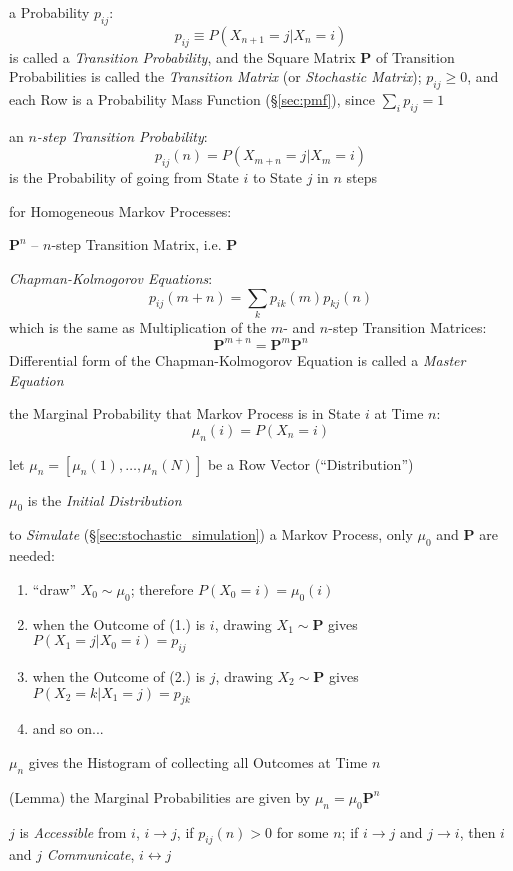 a Probability $p_{ij}$:
\[
  p_{ij} \equiv P(X_{n+1} = j | X_n = i)
\]
is called a \emph{Transition Probability}, and the Square Matrix $\mathbf{P}$ of
Transition Probabilities is called the \emph{Transition Matrix} (or
\emph{Stochastic Matrix});
$p_{ij} \geq 0$, and each Row is a Probability Mass Function (\S\ref{sec:pmf}),
since $\sum_i p_{ij} = 1$

an \emph{$n$-step Transition Probability}:
\[
  p_{ij}(n) = P(X_{m+n} = j | X_m = i)
\]
is the Probability of going from State $i$ to State $j$ in $n$ steps

for Homogeneous Markov Processes:

$\mathbf{P}^n$ -- $n$-step Transition Matrix, i.e. $\mathbf{P}$

\emph{Chapman-Kolmogorov Equations}:
\[
  p_{ij}(m + n) = \sum_k p_{ik}(m) p_{kj}(n)
\]
which is the same as Multiplication of the $m$- and $n$-step Transition
Matrices:
\[
  \mathbf{P}^{m+n} = \mathbf{P}^m \mathbf{P}^n
\]
Differential form of the Chapman-Kolmogorov Equation is called a
\emph{Master Equation}

the Marginal Probability that Markov Process is in State $i$ at Time $n$:
\[
  \mu_n(i) = P(X_n = i)
\]

let $\mu_n = [\mu_n(1), \ldots, \mu_n(N)]$ be a Row Vector (``Distribution'')

$\mu_0$ is the \emph{Initial Distribution}

to \emph{Simulate} (\S\ref{sec:stochastic_simulation}) a Markov Process, only
$\mu_0$ and $\mathbf{P}$ are needed:
\begin{enumerate}
  \item ``draw'' $X_0 \sim \mu_0$; therefore $P(X_0 = i) = \mu_0(i)$
  \item when the Outcome of (1.) is $i$, drawing $X_1 \sim \mathbf{P}$ gives
    $P(X_1 = j | X_0 = i) = p_{ij}$
  \item when the Outcome of (2.) is $j$, drawing $X_2 \sim \mathbf{P}$ gives
    $P(X_2 = k | X_1 = j) = p_{jk}$
  \item and so on...
\end{enumerate}

$\mu_n$ gives the Histogram of collecting all Outcomes at Time $n$

(Lemma) the Marginal Probabilities are given by $\mu_n = \mu_0 \mathbf{P}^n$

$j$ is \emph{Accessible} from $i$, $i \to j$, if $p_{ij}(n) > 0$ for
some $n$; if $i \to j$ and $j \to i$, then $i$ and $j$
\emph{Communicate}, $i \leftrightarrow j$

